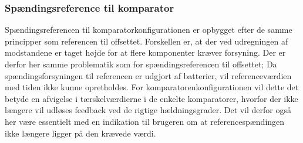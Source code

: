 \subsubsection{Spændingsreference til komparator}
Spændingsreferencen til komparatorkonfigurationen er opbygget efter de samme principper som referencen til offsettet. Forskellen er, at der ved udregningen af modstandene er taget højde for at flere komponenter kræver forsyning. Der er derfor her samme problematik som for spændingsreferencen til offsettet; Da spændingsforsyningen til referencen er udgjort af batterier, vil referenceværdien med tiden ikke kunne opretholdes. For komparatorenkonfigurationen vil dette det betyde en afvigelse i tærskelværdierne i de enkelte komparatorer, hvorfor der ikke længere vil udløses feedback ved de rigtige hældningsgrader. Det vil derfor også her være essentielt med en indikation til brugeren om at referencespændingen ikke længere ligger på den krævede værdi. 

